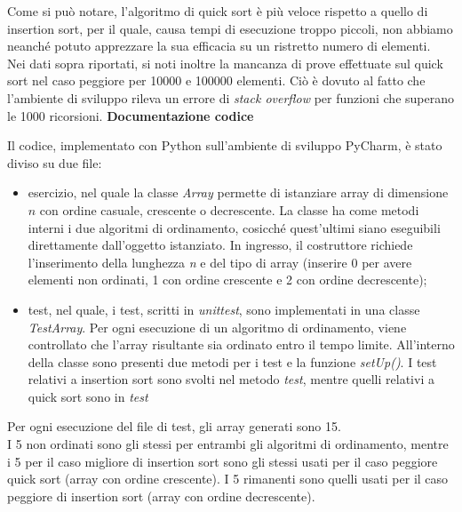 \documentclass[a4paper, 11pt]{article}
\begin{document}
Come si può notare, l'algoritmo di quick sort è più veloce rispetto a quello di insertion sort, per il quale, causa tempi di esecuzione troppo piccoli, non abbiamo neanché potuto apprezzare la sua efficacia su un ristretto numero di elementi.\\
Nei dati sopra riportati, si noti inoltre la mancanza di prove effettuate sul quick sort nel caso peggiore per 10000 e 100000 elementi. Ciò è dovuto al fatto che l'ambiente di sviluppo rileva un errore di \emph{stack overflow} per funzioni che superano le 1000 ricorsioni.
\newpage
\textbf{Documentazione codice}

\vspace{0,7 cm}
Il codice, implementato con Python sull'ambiente di sviluppo PyCharm, è stato diviso su due file:
\begin{itemize}
\item esercizio, nel quale la classe \emph{Array} permette di istanziare array di dimensione $n$ con ordine casuale, crescente o decrescente. La classe ha come metodi interni i due algoritmi di ordinamento, cosicché quest'ultimi siano eseguibili direttamente dall'oggetto istanziato. In ingresso, il costruttore richiede l'inserimento della lunghezza \emph{n} e del tipo di array (inserire 0 per avere elementi non ordinati, 1 con ordine crescente e 2 con ordine decrescente);
\item test, nel quale, i test, scritti in \emph{unittest}, sono implementati in una classe \emph{TestArray}. Per ogni esecuzione di un algoritmo di ordinamento, viene controllato che l'array risultante sia ordinato entro il tempo limite. All'interno della classe sono presenti due metodi per i test e la funzione \emph{setUp()}. I test relativi a insertion sort sono svolti nel metodo \emph{test}, mentre quelli relativi a quick sort sono in \emph{test}
\end{itemize}

\vspace{0,4 cm}
Per ogni esecuzione del file di test, gli array generati sono 15.\\
I 5 non ordinati sono gli stessi per entrambi gli algoritmi di ordinamento, mentre i 5 per il caso migliore di insertion sort sono gli stessi usati per il caso peggiore quick sort (array con ordine crescente). I 5 rimanenti sono quelli usati per il caso peggiore di insertion sort (array con ordine decrescente).
\end{document}
